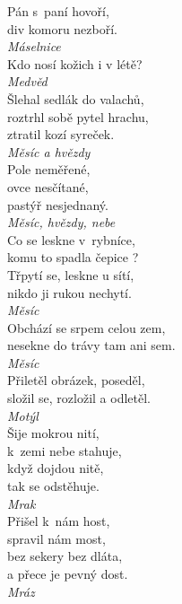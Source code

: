 \begin{multicols}{4}
\noindent
Pán s~paní hovoří,\\
div komoru nezboří.\\[1 mm]
{\sl Máselnice}\\

\noindent
Kdo nosí kožich i v létě?\\[1 mm]
{\sl Medvěd}\\

\noindent
Šlehal sedlák do valachů,\\
roztrhl sobě pytel hrachu,\\
ztratil kozí syreček.\\[1 mm]
{\sl Měsíc a hvězdy}\\

\noindent
Pole neměřené,\\
ovce nesčítané,\\
pastýř nesjednaný.\\[1 mm]
{\sl Měsíc, hvězdy, nebe}\\

\noindent
Co se leskne v~rybníce,\\
komu to spadla čepice ?\\
Třpytí se, leskne u sítí,\\
nikdo ji rukou nechytí.\\[1 mm]
{\sl Měsíc}\\

\noindent
Obchází se srpem celou zem,\\
nesekne do trávy tam ani sem.\\[1 mm]
{\sl Měsíc}\\

\noindent
Přiletěl obrázek, poseděl,\\
složil se, rozložil a odletěl.\\[1 mm]
{\sl Motýl}\\

\noindent
Šije mokrou nití,\\
k~zemi nebe stahuje,\\
když dojdou nitě,\\
tak se odstěhuje.\\[1 mm]
{\sl Mrak}\\

\noindent
Přišel k~nám host,\\
spravil nám most,\\
bez sekery bez dláta,\\
a přece je pevný dost.\\[1 mm]
{\sl Mráz}\\


\end{multicols}

